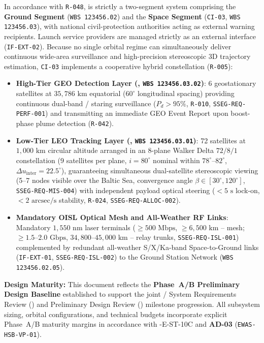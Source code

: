 In accordance with \texttt{R-048},  is strictly a two-segment system comprising the \textbf{Ground Segment} (\texttt{WBS 123456.02}) and the \textbf{Space Segment} (\texttt{CI-03}, \texttt{WBS 123456.03}), with national civil-protection authorities acting as external warning recipients. Launch service providers are managed strictly as an external interface (\texttt{IF-EXT-02}). Because no single orbital regime can simultaneously deliver continuous wide-area surveillance and high-precision stereoscopic 3D trajectory estimation, \texttt{CI-03} implements a cooperative hybrid constellation (\texttt{R-005}):
\begin{itemize}[leftmargin=1.5em, itemsep=0.2em, topsep=0.15em]
    \item \textbf{High-Tier GEO Detection Layer (, \texttt{WBS 123456.03.02})}: 6 geostationary satellites at $35{,}786\text{ km}$ equatorial ($60^\circ$ longitudinal spacing) providing continuous dual-band / staring surveillance ($P_d > 95\%$, \texttt{R-010}, \texttt{SSEG-REQ-PERF-001}) and transmitting an immediate GEO Event Report upon boost-phase plume detection (\texttt{R-042}).
    \item \textbf{Low-Tier LEO Tracking Layer (, \texttt{WBS 123456.03.01})}: 72 satellites at $1{,}000\text{ km}$ circular altitude arranged in an 8-plane Walker Delta $72/8/1$ constellation (9 satellites per plane, $i = 80^\circ$ nominal within $78^\circ\text{--}82^\circ$, $\Delta u_{\text{inter}} = 22.5^\circ$), guaranteeing simultaneous dual-satellite stereoscopic viewing (5--7 nodes visible over the Baltic Sea, convergence angle $\beta \in [30^\circ, 120^\circ]$, \texttt{SSEG-REQ-MIS-004}) with independent payload optical  steering ($< 5\text{ s}$ lock-on, $< 2\text{ arcsec/s}$ stability, \texttt{R-024}, \texttt{SSEG-REQ-ALLOC-002}).
    \item \textbf{Mandatory OISL Optical Mesh and All-Weather RF Links}: Mandatory $1{,}550\text{ nm}$ laser  terminals ($\ge 500\text{ Mbps}$, $\ge 6{,}500\text{ km}$ -- mesh; $\ge 1.5\text{--}2.0\text{ Gbps}$, $34{,}800\text{--}45{,}000\text{ km}$ -- relay trunks, \texttt{SSEG-REQ-ISL-001}) complemented by redundant all-weather S/X/Ka-band  Space-to-Ground links (\texttt{IF-EXT-01}, \texttt{SSEG-REQ-ISL-002}) to the Ground Station Network (\texttt{WBS 123456.02.05}).
\end{itemize}

\textbf{Design Maturity:} This document reflects the \textbf{Phase~A/B Preliminary Design Baseline} established to support the joint / System Requirements Review () and Preliminary Design Review () milestone progression. All subsystem sizing, orbital configurations, and technical budgets incorporate explicit Phase~A/B maturity margins in accordance with -E-ST-10C and \textbf{AD-03} (\texttt{EWAS-HSB-VP-01}).


